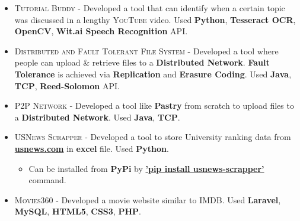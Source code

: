 \documentclass[letterpaper,10pt]{article}
\begin{document}
\begin{itemize}
    \item \textsc{Tutorial Buddy} - 
        Developed a tool that can identify when a certain topic was discussed in a lengthy \textsc{YouTube} video. 
        Used \textbf{Python}, \textbf{Tesseract OCR}, \textbf{OpenCV}, \textbf{Wit.ai Speech Recognition} API.
    
    \item \textsc{Distributed and Fault Tolerant File System} - 
        Developed a tool where people can upload \& retrieve files to a \textbf{Distributed Network}. \textbf{Fault Tolerance} is achieved via \textbf{Replication} and \textbf{Erasure Coding}.
        Used \textbf{Java}, \textbf{TCP}, \textbf{Reed-Solomon} API.
    
    \item \textsc{P2P Network} - 
        Developed a tool like \textbf{Pastry} from scratch to upload files to a \textbf{Distributed Network}.
        Used \textbf{Java}, \textbf{TCP}.
    
    
    \item \textsc{USNews Scrapper} - 
        Developed a tool to store University ranking data from \href{https://www.usnews.com/best-graduate-schools}{\textbf{usnews.com}} in \textbf{excel} file. 
        Used \textbf{Python}.
    \begin{itemize}
        \item 
        Can be installed from \textbf{PyPi} by \href{https://github.com/OvroAbir/USNews-Scrapper}{{\normalsize\textbf{'pip install usnews-scrapper'}}} command.
    \end{itemize}
    
    \item \textsc{Movies360} - 
        Developed a movie website similar to \textsc{IMDB}.
        Used \textbf{Laravel}, \textbf{MySQL}, \textbf{HTML5}, \textbf{CSS3}, \textbf{PHP}.
    

\end{itemize}
\end{document}
